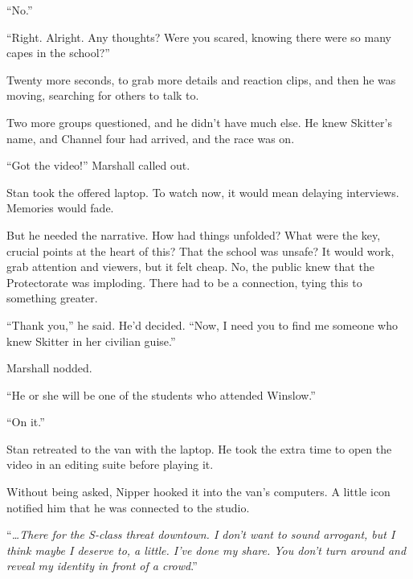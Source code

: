 ``No.''



``Right.  Alright.  Any thoughts?  Were you scared, knowing there were so many capes in the school?''



Twenty more seconds, to grab more details and reaction clips, and then he was moving, searching for others to talk to.



Two more groups questioned, and he didn't have much else.  He knew Skitter's name, and Channel four had arrived, and the race was on.



``Got the video!'' Marshall called out.



Stan took the offered laptop.  To watch now, it would mean delaying interviews.  Memories would fade.



But he needed the narrative.  How had things unfolded?  What were the key, crucial points at the heart of this?  That the school was unsafe?  It would work, grab attention and viewers, but it felt cheap.  No, the public knew that the Protectorate was imploding.  There had to be a connection, tying this to something greater.



``Thank you,'' he said.  He'd decided.  ``Now, I need you to find me someone who knew Skitter in her civilian guise.''



Marshall nodded.



``He or she will be one of the students who attended Winslow.''



``On it.''



Stan retreated to the van with the laptop.  He took the extra time to open the video in an editing suite before playing it.



Without being asked, Nipper hooked it into the van's computers.  A little icon notified him that he was connected to the studio.



``\emph{\ldots{}There for the S-class threat downtown.  I don't want to sound arrogant, but I think maybe I deserve to, a little.  I've done my share.  You don't turn around and reveal my identity in front of a crowd}.''



